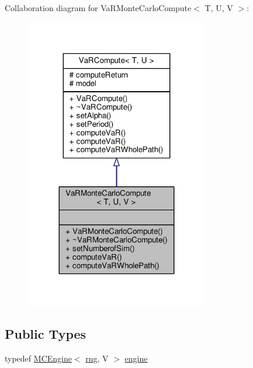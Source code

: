 Collaboration diagram for Va\+R\+Monte\+Carlo\+Compute$<$ T, U, V $>$\+:
\nopagebreak
\begin{figure}[H]
\begin{center}
\leavevmode
\includegraphics[width=227pt]{classVaRMonteCarloCompute__coll__graph}
\end{center}
\end{figure}
\subsection*{Public Types}
\begin{DoxyCompactItemize}
\item 
typedef \hyperlink{classMCEngine}{M\+C\+Engine}$<$ \hyperlink{classrng}{rng}, V $>$ \hyperlink{classVaRMonteCarloCompute_a7ab31736fcc0c8c0630232d522186250}{engine}
\end{DoxyCompactItemize}
